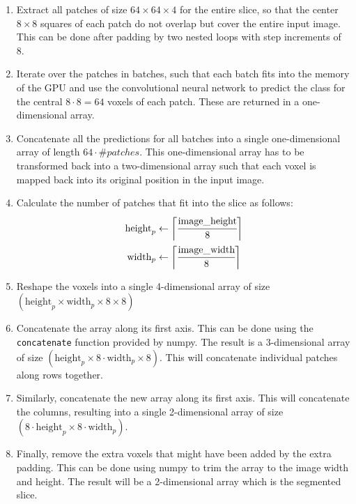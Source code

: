 \documentclass[12pt,a4paper,twoside,openright]{report}
\begin{document}
\begin{enumerate}
	\item Extract all patches of size $64 \times 64 \times 4$ for the entire slice, so that the center $8 \times 8$ squares of each patch do not overlap but cover the entire input image. This can be done after padding by two nested loops with step increments of 8.
	\item Iterate over the patches in batches, such that each batch fits into the memory of the GPU and use the convolutional neural network to predict the class for the central $8 \cdot 8 = 64$ voxels of each patch. These are returned in a one-dimensional array.
	\item Concatenate all the predictions for all batches into a single one-dimensional array of length $64 \cdot \#patches$. This one-dimensional array has to be transformed back into a two-dimensional array such that each voxel is mapped back into its original position in the input image.
	\item Calculate the number of patches that fit into the slice as follows:
		\begin{equation}
		\begin{split}
			\text{height}_p & \gets \bigg \lceil \cfrac{\text{image\_height}}{8} \bigg \rceil 	 \\
			\text{width}_p & \gets \bigg \lceil \cfrac{\text{image\_width}}{8} \bigg \rceil 	 \\
		\end{split}		
		\end{equation}
	\item Reshape the voxels into a single 4-dimensional array of size $(\text{height}_p \times \text{width}_p \times 8 \times 8)$
	\item Concatenate the array along its first axis. This can be done using the \texttt{concatenate} function provided by numpy. The result is a 3-dimensional array of size $(\text{height}_p \times 8 \cdot \text{width}_p \times 8)$. This will concatenate individual patches along rows together.
	\item Similarly, concatenate the new array along its first axis. This will concatenate the columns, resulting into a single 2-dimensional array of size $(8 \cdot \text{height}_p \times 8 \cdot \text{width}_p)$.
	\item Finally, remove the extra voxels that might have been added by the extra padding. This can be done using numpy to trim the array to the image width and height. The result will be a 2-dimensional array which is the segmented slice.
\end{enumerate}
\end{document}
